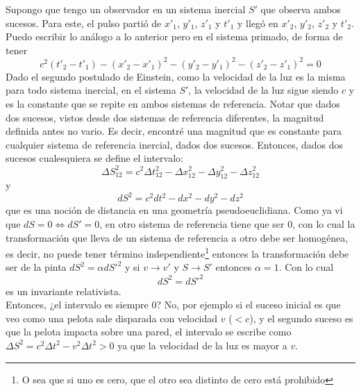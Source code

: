 \indent Supongo que tengo un observador en un sistema inercial $S'$ que observa ambos sucesos. Para este, el pulso partió de $x'_{1}$, $y'_{1}$, $z'_{1}$ y $t'_{1}$ y llegó en $x'_{2}$, $y'_{2}$, $z'_{2}$ y $t'_{2}$. Puedo escribir lo análogo a lo anterior pero en el sistema primado, de forma de tener
\begin{equation*}
    c^{2}(t'_{2}-t'_{1}) - (x'_{2}-x'_{1})^{2} -(y'_{2}-y'_{1})^{2}-(z'_{2}-z'_{1})^{2} = 0
\end{equation*}
Dado el segundo postulado de Einstein, como la velocidad de la luz es la misma para todo sistema inercial, en el sistema $S'$, la velocidad de la luz sigue siendo $c$ y es la constante que se repite en ambos sistemas de referencia. Notar que dados dos sucesos, vistos desde dos sistemas de referencia diferentes, la magnitud definida antes no vario. Es decir, encontré una magnitud que es constante para cualquier sistema de referencia inercial, dados dos sucesos. Entonces, dados dos sucesos cualesquiera se define el intervalo:
\begin{equation*}
    \Delta S_{12}^{2} = c^{2}\Delta t_{12}^{2} -\Delta x_{12}^{2} - \Delta y_{12}^{2} - \Delta z_{12}^{2}
\end{equation*}
y 
\begin{equation*}
    dS^{2} = c^{2}dt^{2} - dx^{2} - dy^{2} - dz^{2}
\end{equation*}
que es una noción de distancia en una geometría pseudoeuclidiana. Como ya vi que $dS = 0 \Longleftrightarrow dS' = 0$, en otro sistema de referencia tiene que ser $0$, con lo cual la transformación que lleva de un sistema de referencia a otro debe ser homogénea, es decir, no puede tener término independiente\footnote{O sea que si uno es cero, que el otro sea distinto de cero está prohibido} entonces la transformación debe ser de la pinta $dS^{2} = \alpha dS'^{2}$ y si $v \longrightarrow v'$ y $S \longrightarrow S'$ entonces $\alpha = 1$. Con lo cual  
\begin{equation*}
    \boxed{
        dS^{2} = dS'^{2}
    }
\end{equation*}
es un invariante relativista.\\
\indent Entonces, ¿el intervalo es siempre $0$? No, por ejemplo si el suceso inicial es que veo como una pelota sale disparada con velocidad $v$ ($< c$), y el segundo suceso es que la pelota impacta sobre una pared, el intervalo se escribe como $\Delta S^{2} = c^{2}\Delta t^{2} - v^{2}\Delta t^{2} > 0$ ya que la velocidad de la luz es mayor a $v$.\\
